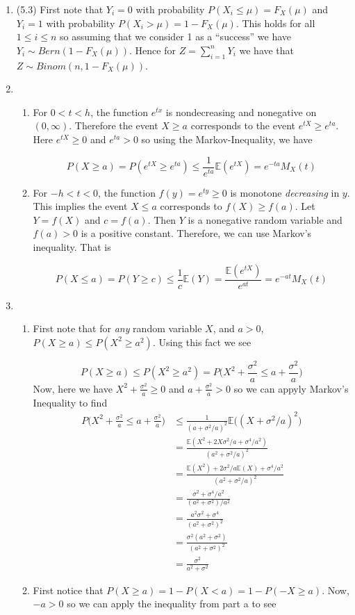 \documentclass[12pt]{article}  %
\newcommand{\E}{{\mathbb{E}}}
\begin{document}
\begin{enumerate}
\item (5.3) First note that $Y_i = 0 $ with probability $P(X_i\leq \mu) = F_{X}(\mu)$ and $Y_i = 1$ with probability $P(X_i>\mu) = 1 - F_{X}(\mu)$. This holds for all $1\leq i\leq n$ so assuming that we consider 1 as a ``success'' we have $Y_i\sim Bern(1-F_X(\mu))$. Hence for $Z = \sum_{i=1}^{n}Y_i$ we have that $Z \sim Binom(n, 1-F_X(\mu))$. 

\item 
\begin{enumerate}

\item For $0<t<h$, the function $e^{tx}$ is nondecreasing and nonegative on $(0,\infty)$. Therefore the event $X\geq a$ corresponds to the event $e^{tX}\geq e^{ta}$. Here $e^{tX}\geq0$ and $e^{ta}>0$ so using the Markov-Inequality, we have 

$$P(X\geq a) = P(e^{tX}\geq e^{ta}) \leq \frac{1}{e^{ta}}\E(e^{tX}) = e^{-ta}M_X(t)$$

\item For $-h<t<0$, the function $f(y) = e^{ty}\geq 0$ is monotone \textit{decreasing} in $y$. This implies the event $X\leq a$ corresponds to $f(X)\geq f(a)$. Let $Y = f(X)$ and $c = f(a)$. Then $Y$ is a nonegative random variable and $f(a)>0$ is a positive constant. Therefore, we can use Markov's inequality. That is 

$$P(X\leq a) = P(Y\geq c)\leq \frac{1}{c}\E(Y) = \frac{\E(e^{tX})}{e^{at}} = e^{-at}M_X(t)$$

\end{enumerate} 

\item 
\begin{enumerate}

\item First note that for \textit{any} random variable $X$, and $a>0$, $P(X\geq a)\leq P(X^2\geq a^2)$. Using this fact we see 

$$P(X\geq a) \leq P(X^2\geq a^2) = P\big(X^2 + \frac{\sigma^2}{a}\leq a + \frac{\sigma^2}{a}\big)$$ Now, here we have $X^2 + \frac{\sigma^2}{a}\geq 0$ and $a + \frac{\sigma^2}{a}>0$ so we can appyly Markov's Inequality to find 
\begin{align*}
 P\big(X^2 + \frac{\sigma^2}{a}\leq a + \frac{\sigma^2}{a}\big)&\leq \frac{1}{(a + \sigma^2/a)^2}\E\big((X + \sigma^2/a)^2\big)\\
&= \frac{\E(X^2 + 2X\sigma^2/a + \sigma^4/a^2)}{(a^2+\sigma^2/a)^2}\\
&= \frac{\E(X^2) + 2\sigma^2/a\E(X) + \sigma^4/a^2}{(a^2 + \sigma^2/a)^2}\\
&= \frac{\sigma^2 + \sigma^4/a^2}{(a^2+\sigma^2)/a^2}\\
&= \frac{a^2\sigma^2 + \sigma^4}{(a^2 + \sigma^2)^2}\\
&= \frac{\sigma^2(a^2 + \sigma^2)}{(a^2 + \sigma^2)^2}\\
&= \frac{\sigma^2}{a^2 + \sigma^2}
\end{align*}
\item First notice that $P(X\geq a) = 1 - P(X<a) = 1-P(-X\geq a)$. Now, $-a>0$ so we can apply the inequality from part a to see 


\end{enumerate}
\end{enumerate}
\end{document}
